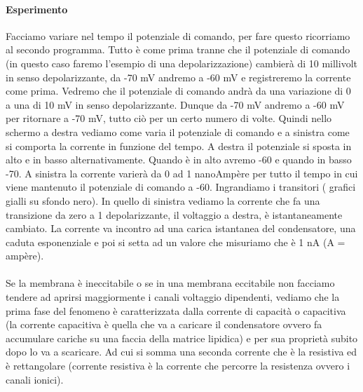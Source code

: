 \documentclass[a4paper,12pt]{article}
\begin{document}
\paragraph{Esperimento}

Facciamo variare nel tempo il potenziale di comando, per fare questo ricorriamo al secondo programma. Tutto è come prima tranne che il potenziale di comando (in questo caso faremo l’esempio di una depolarizzazione) cambierà di 10 millivolt in senso depolarizzante, da -70 mV andremo a -60 mV e registreremo la corrente come prima. 
Vedremo che il potenziale di comando andrà da una variazione di 0 a una di 10 mV in senso depolarizzante. Dunque da -70 mV andremo a -60 mV per ritornare a -70 mV, tutto ciò per un certo numero di volte. Quindi nello schermo a destra vediamo come varia il potenziale di comando e a sinistra come si comporta la corrente in funzione del tempo. 
A destra il potenziale si sposta in alto e in basso alternativamente. Quando è in alto avremo -60 e quando in basso -70. A sinistra la corrente varierà da 0 ad 1 nanoAmpère per tutto il tempo in cui viene mantenuto il potenziale di comando a -60.
Ingrandiamo i transitori ( grafici gialli su sfondo nero). In quello di sinistra vediamo la corrente che fa una transizione da zero a 1 depolarizzante, il voltaggio a destra, è istantaneamente cambiato. La corrente va incontro ad una carica istantanea del condensatore, una caduta esponenziale e poi si setta ad un valore che misuriamo che è 1 nA (A = ampère).

\paragraph{}
Se la membrana è ineccitabile o se in una membrana eccitabile non facciamo tendere ad aprirsi maggiormente i canali voltaggio dipendenti, vediamo che la prima fase del fenomeno è caratterizzata dalla corrente di capacità o capacitiva (la corrente capacitiva è quella che va a caricare il condensatore ovvero fa accumulare cariche su una faccia della matrice lipidica) e per sua proprietà subito dopo lo va a scaricare. Ad cui si somma una seconda corrente che è la resistiva ed è rettangolare (corrente resistiva è la corrente che percorre la resistenza ovvero i canali ionici). 
\end{document}

